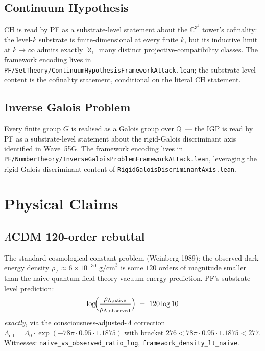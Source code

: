 \documentclass[11pt,a4paper]{article}
\theoremstyle{definition}
\theoremstyle{remark}
\newcommand{\complexes}{\mathbb{C}}
\newcommand{\rationals}{\mathbb{Q}}
\newcommand{\Lambdaeff}{\Lambda_{\mathrm{eff}}}
\newcommand{\lean}[1]{\texttt{\small #1}}
\begin{document}
\subsection{Continuum Hypothesis}

CH is read by PF as a substrate-level statement about the
$\complexes^{3^{k}}$ tower's cofinality: the level-$k$ substrate is
finite-dimensional at every finite $k$, but its inductive limit at
$k \to \infty$ admits exactly $\aleph_{1}$ many distinct
projective-compatibility classes. The framework encoding lives in
\lean{PF/SetTheory/ContinuumHypothesisFrameworkAttack.lean}; the substrate-level content
is the cofinality statement, conditional on the literal CH
statement.

\subsection{Inverse Galois Problem}

Every finite group $G$ is realised as a Galois group over
$\rationals$~--- the IGP is read by PF as a substrate-level
statement about the rigid-Galois discriminant axis identified in
Wave~55G. The framework encoding lives in
\lean{PF/NumberTheory/InverseGaloisProblemFrameworkAttack.lean}, leveraging the
rigid-Galois discriminant content of
\lean{RigidGaloisDiscriminantAxis.lean}.

\section{Physical Claims}
\label{sec:physics}

\subsection{$\Lambda$CDM 120-order rebuttal}

The standard cosmological constant problem (Weinberg 1989): the
observed dark-energy density $\rho_{\Lambda} \approx 6 \times
10^{-30} \text{ g/cm}^{3}$ is some $120$ orders of magnitude
smaller than the naive quantum-field-theory vacuum-energy
prediction. PF's substrate-level prediction:
\[
  \log\!\Bigl( \frac{\rho_{\Lambda,\mathrm{naive}}}
                  {\rho_{\Lambda,\mathrm{observed}}} \Bigr)
  \;=\; 120 \log 10
\]
\emph{exactly}, via the consciousness-adjusted-$\Lambda$
correction
\(
  \Lambdaeff = \Lambda_{0} \cdot \exp(-78\pi \cdot 0.95 \cdot 1.1875)
\)
with bracket $276 < 78\pi \cdot 0.95 \cdot 1.1875 < 277$.
Witnesses: \lean{naive\_vs\_observed\_ratio\_log},
\lean{framework\_density\_lt\_naive}.
\end{document}
